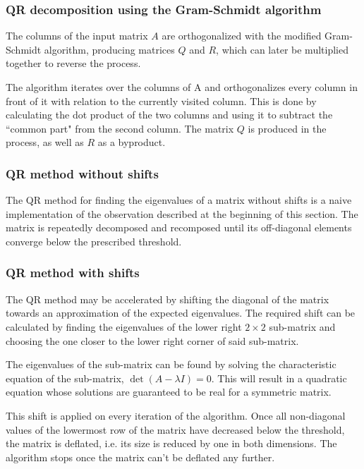 \documentclass{article}
\begin{document}
	\subsubsection{QR decomposition using the Gram-Schmidt algorithm}
	
	The columns of the input matrix $A$ are orthogonalized with the modified
	Gram-Schmidt algorithm, producing matrices $Q$ and $R$, which can later be
	multiplied together to reverse the process.
	
	The algorithm iterates over the columns of A and orthogonalizes every column
	in front of it with relation to the currently visited column. This is done
	by calculating the dot product of the two columns and using it to subtract
	the ``common part" from the second column. The matrix $Q$ is produced in the
	process, as well as $R$ as a byproduct.
	
	\subsubsection{QR method without shifts}
	
	The QR method for finding the eigenvalues of a matrix without shifts is a
	naive implementation of the observation described at the beginning of this
	section. The matrix is repeatedly decomposed and recomposed until its
	off-diagonal elements converge below the prescribed threshold.
	
	\subsubsection{QR method with shifts}
	
	The QR method may be accelerated by shifting the diagonal of the matrix
	towards an approximation of the expected eigenvalues. The required shift can
	be calculated by finding the eigenvalues of the lower right $2 \times 2$
	sub-matrix and choosing the one closer to the lower right corner of said
	sub-matrix.
	
	The eigenvalues of the sub-matrix can be found by solving the characteristic
	equation of the sub-matrix, $\det{(A - \lambda I)} = 0$. This will result in
	a quadratic equation whose solutions are guaranteed to be real for a
	symmetric matrix.
	
	This shift is applied on every iteration of the algorithm. Once all
	non-diagonal values of the lowermost row of the matrix have decreased below
	the threshold, the matrix is deflated, i.e. its size is reduced by one in
	both dimensions. The algorithm stops once the matrix can't be deflated any
	further.
	
\end{document}
